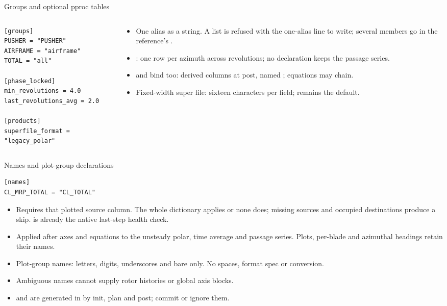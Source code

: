 \begin{frame}[fragile]{Groups and optional pproc tables}
\begin{columns}[T]
\begin{column}{0.47\textwidth}
\begin{lstlisting}[style=ftsbase]
[groups]
PUSHER = "PUSHER"
AIRFRAME = "airframe"
TOTAL = "all"

[phase_locked]
min_revolutions = 4.0
last_revolutions_avg = 2.0

[products]
superfile_format = "legacy_polar"
\end{lstlisting}
\end{column}
\begin{column}{0.49\textwidth}
\begin{itemize}\small
\item One alias as a string. A list is refused with the
one-alias line to write; several members go in the reference's \code{[aliases]}.
\item {}: one row per azimuth across revolutions;
no declaration keeps the passage series.
\item \code{[equations]} and \code{[glossary]} bind too: derived
columns at post, named ; equations may chain.
\item Fixed-width super file: sixteen characters per field; 
remains the default.
\end{itemize}
\end{column}
\end{columns}
\end{frame}

\begin{frame}[fragile]{Names and plot-group declarations}
\begin{lstlisting}[style=ftsbase]
[names]
CL_MRP_TOTAL = "CL_TOTAL"
\end{lstlisting}
\begin{itemize}\small
\item Requires that plotted source column. The whole dictionary applies or
none does; missing sources and occupied destinations produce a 
skip.  is already the native last-step health check.
\item Applied after axes and equations to the unsteady polar, time average
and passage series. Plots, per-blade and azimuthal headings retain their names.
\item Plot-group names: letters, digits, underscores and bare
 only. No spaces, format spec or conversion.
\item Ambiguous names cannot supply rotor histories or global axis blocks.
\item {} and  are generated in
 by init, plan and post; commit or ignore them.
\end{itemize}
\end{frame}

